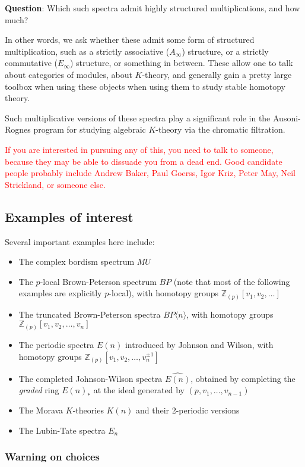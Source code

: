 \documentclass[12pt,titlepage]{article}
\newcommand{\rd}[1]{{\textcolor{red}{#1}}}
\theoremstyle{plain}
\theoremstyle{definition}
\theoremstyle{remark}
\begin{document}
\textbf{Question}: Which such spectra admit highly structured multiplications, and how much?

In other words, we ask whether these admit some form of structured multiplication, such as a strictly associative ($A_\infty$) structure, or a strictly commutative ($E_\infty$) structure, or something in between. These allow one to talk about categories of modules, about $K$-theory, and generally gain a pretty large toolbox when using these objects when using them to study stable homotopy theory.

Such multiplicative versions of these spectra play a significant role in the Ausoni-Rognes program for studying algebraic $K$-theory via the chromatic filtration.

\rd{If you are interested in pursuing any of this, you need to talk to someone, because they may be able to dissuade you from a dead end. Good candidate people probably include Andrew Baker, Paul Goerss, Igor Kriz, Peter May, Neil Strickland, or someone else.}

\hypertarget{examples_of_interest_2}{}\subsection{{Examples of interest}}\label{examples_of_interest_2}

Several important examples here include:

\begin{itemize}%
\item The complex bordism spectrum $MU$


\item The $p$-local Brown-Peterson spectrum $BP$ (note that most of the following examples are explicitly $p$-local), with homotopy groups $\mathbb{Z}_{(p)}[v_1,v_2,\ldots]$


\item The truncated Brown-Peterson spectra $BP\langle n\rangle$, with homotopy groups $\mathbb{Z}_{(p)}[v_1,v_2,\ldots, v_n]$


\item The periodic spectra $E(n)$ introduced by Johnson and Wilson, with homotopy groups $\mathbb{Z}_{(p)}[v_1,v_2,\ldots, v_n^{\pm 1}]$


\item The completed Johnson-Wilson spectra $\widehat{E(n)}$, obtained by completing the \emph{graded} ring $E(n)_*$ at the ideal generated by $(p,v_1,\ldots,v_{n-1})$


\item The Morava $K$-theories $K(n)$ and their 2-periodic versions


\item The Lubin-Tate spectra $E_n$



\end{itemize}
\hypertarget{warning_on_choices_3}{}\subsubsection{{Warning on choices}}\label{warning_on_choices_3}
\end{document}
